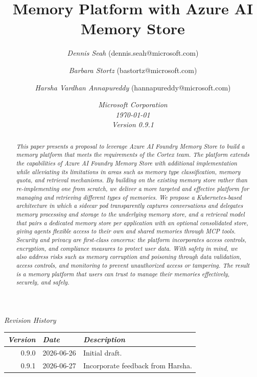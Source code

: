 \documentclass[9pt]{extarticle}%
\title{Memory Platform with Azure AI Memory Store}%
\author{\textit{Dennis Seah} (dennis.seah@microsoft.com) \and \textit{Barbara Stortz} (bastortz@microsoft.com) \and \textit{Harsha Vardhan Annapureddy} (hannapureddy@microsoft.com)}%
\date{{\large \textit{Microsoft Corporation}}\\[2em]\textit{\today}\\[0.5em]\textit{Version 0.9.1}}%
\begin{document}
%
\normalsize%
\maketitle%
\thispagestyle{empty}%
\begin{abstract}\itshape%
This paper presents a proposal to leverage Azure AI Foundry Memory Store to build a memory platform that meets the requirements of the Cortex team. The platform extends the capabilities of Azure AI Foundry Memory Store with additional implementation while alleviating its limitations in areas such as memory type classification, memory quota, and retrieval mechanisms. By building on the existing memory store rather than re-implementing one from scratch, we deliver a more targeted and effective platform for managing and retrieving different types of memories. We propose a Kubernetes-based architecture in which a sidecar pod transparently captures conversations and delegates memory processing and storage to the underlying memory store, and a retrieval model that pairs a dedicated memory store per application with an optional consolidated store, giving agents flexible access to their own and shared memories through MCP tools. Security and privacy are first-class concerns: the platform incorporates access controls, encryption, and compliance measures to protect user data. With safety in mind, we also address risks such as memory corruption and poisoning through data validation, access controls, and monitoring to prevent unauthorized access or tampering. The result is a memory platform that users can trust to manage their memories effectively, securely, and safely.%
\end{abstract}%
\vspace{1em}%

%
\begin{center}\textit{Revision History}\end{center}%

%
\begin{center}%
\small%
\renewcommand{\arraystretch}{1.75}%
\begin{tabular}{@{}rll@{}}%
\textit{Version} & \textit{Date} & \textit{Description} \\%
\hline%
0.9.0 & 2026-06-26 & Initial draft. \\%
0.9.1 & 2026-06-27 & Incorporate feedback from Harsha. \\%
\end{tabular}%
\end{center}%

%
\newpage%
\newpage%
\end{document}
